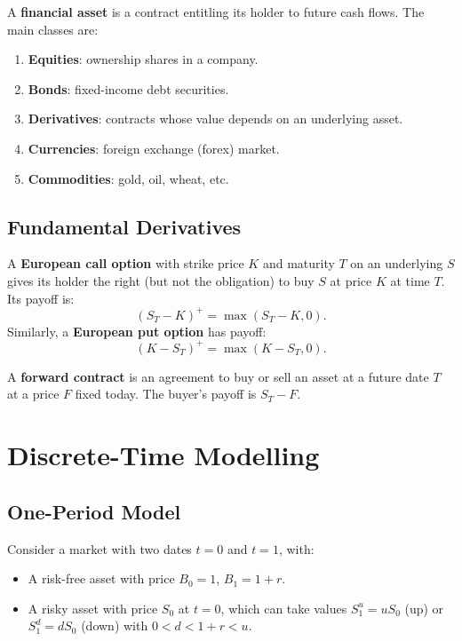 \begin{definition}
A \textbf{financial asset} is a contract entitling its holder to future
cash flows. The main classes are:
\begin{enumerate}
    \item \textbf{Equities}: ownership shares in a company.
    \item \textbf{Bonds}: fixed-income debt securities.
    \item \textbf{Derivatives}: contracts whose value depends on an underlying asset.
    \item \textbf{Currencies}: foreign exchange (forex) market.
    \item \textbf{Commodities}: gold, oil, wheat, etc.
\end{enumerate}
\end{definition}

\subsection{Fundamental Derivatives}

\begin{definition}
A \textbf{European call option} with strike price $K$ and maturity $T$ on
an underlying $S$ gives its holder the right (but not the obligation) to buy
$S$ at price $K$ at time $T$. Its payoff is:
\[
    (S_T - K)^+ = \max(S_T - K, 0).
\]
Similarly, a \textbf{European put option} has payoff:
\[
    (K - S_T)^+ = \max(K - S_T, 0).
\]
\end{definition}

\begin{definition}
A \textbf{forward contract} is an agreement to buy or sell an asset at
a future date $T$ at a price $F$ fixed today. The buyer's payoff is $S_T - F$.
\end{definition}

\section{Discrete-Time Modelling}

\subsection{One-Period Model}

Consider a market with two dates $t=0$ and $t=1$, with:
\begin{itemize}
    \item A risk-free asset with price $B_0 = 1$, $B_1 = 1+r$.
    \item A risky asset with price $S_0$ at $t=0$, which can take values
          $S_1^u = uS_0$ (up) or $S_1^d = dS_0$ (down) with $0 < d < 1+r < u$.
\end{itemize}


